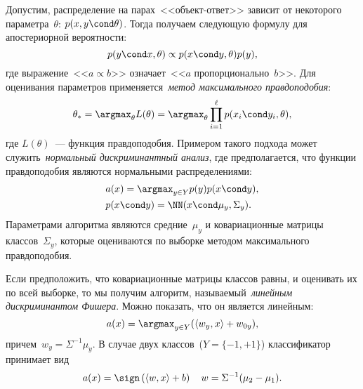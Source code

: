 \documentclass[12pt,fleqn]{article}
\begin{document}
Допустим, распределение на парах~<<объект-ответ>> зависит от
некоторого параметра~$\theta$: $p(x, y \cond \theta)$.
Тогда получаем следующую формулу для апостериорной вероятности:
\[
    p(y \cond x, \theta)
    \propto
    p(x \cond y, \theta) p(y),
\]
где выражение~<<$a \propto b$>> означает~<<$a$ пропорционально~$b$>>.
Для оценивания параметров применяется~\emph{метод максимального правдоподобия}:
\[
    \theta_*
    =
    \argmax_\theta
        L(\theta)
    =
    \argmax_\theta
        \prod_{i = 1}^{\ell} p(x_i \cond y_i, \theta),
\]
где $L(\theta)$~--- функция правдоподобия.
Примером такого подхода может служить~\emph{нормальный дискриминантный анализ},
где предполагается, что функции правдоподобия являются нормальными распределениями:
\begin{align*}
    &a(x) = \argmax_{y \in Y} p(y) p(x \cond y),\\
    &p(x \cond y) = \NN(x \cond \mu_y, \Sigma_y).
\end{align*}
Параметрами алгоритма являются средние~$\mu_y$ и
ковариационные матрицы классов~$\Sigma_y$,
которые оцениваются по выборке методом максимального
правдоподобия.

	\par Если предположить, что ковариационные матрицы классов равны,
и оценивать их по всей выборке, то мы получим алгоритм,
называемый~\emph{линейным дискриминантом Фишера}.
Можно показать, что он является линейным:
\[
    a(x)
    =
    \argmax_{y \in Y} ( \langle w_y, x \rangle + w_{0y} ),
\]
причем~$w_y = \Sigma^{-1} \mu_y$.
В случае двух классов~($Y = \{-1, +1\}$) классификатор принимает вид
\begin{equation}
\label{eq:ldaClassifier}
    a(x)
    =
    \sign \left(
        \langle w, x \rangle + b
    \right)
    \quad
    w = \Sigma^{-1} (\mu_2 - \mu_1).
\end{equation}
\end{document}
